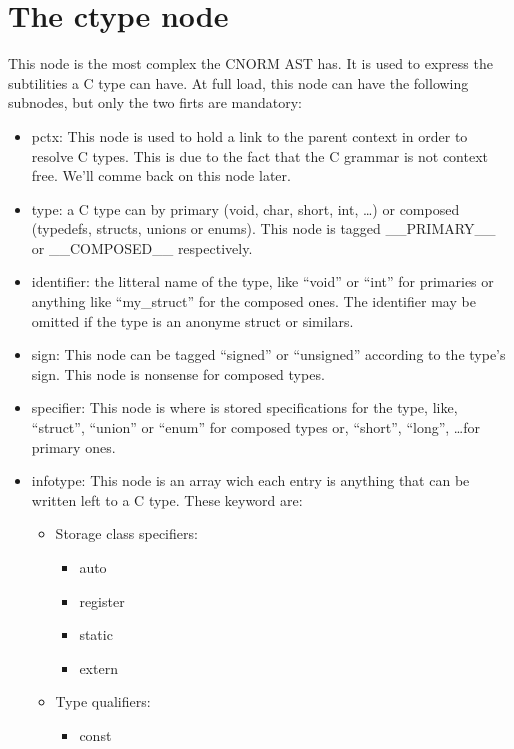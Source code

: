 \documentclass[a4paper,11pt]{report}
\begin{document}
  \section{The ctype node}

  This node is the most complex the CNORM AST has. It is used to express
  the subtilities a C type can have. At full load, this node can have the
  following subnodes, but only the two firts are mandatory:

  \begin{itemize}
    \item pctx: This node is used to hold a link to the parent context in
      order to resolve C types. This is due to the fact that the C grammar
      is not context free. We'll comme back on this node later.
    \item type: a C type can by primary (void, char, short, int, \dots) or
      composed (typedefs, structs, unions or enums). This node is tagged
      \_\_PRIMARY\_\_ or \_\_COMPOSED\_\_ respectively.
    \item identifier: the litteral name of the type, like ``void'' or ``int''
      for primaries or anything like ``my\_struct'' for the composed ones.
      The identifier may be omitted if the type is an anonyme struct or
      similars.
    \item sign: This node can be tagged ``signed'' or ``unsigned'' according
      to the type's sign. This node is nonsense for composed types.
    \item specifier: This node is where is stored specifications for the type,
      like, ``struct'', ``union'' or ``enum'' for composed types or,
      ``short'', ``long'', \dots for primary ones.
    \item infotype: This node is an array wich each entry is anything that
      can be written left to a C type. These keyword are:
      \begin{itemize}
        \item Storage class specifiers:
          \begin{itemize}
            \item auto
            \item register
            \item static
            \item extern
          \end{itemize}
        \item Type qualifiers:
          \begin{itemize}
            \item const

\end{itemize}
\end{itemize}
\end{itemize}
\end{document}
